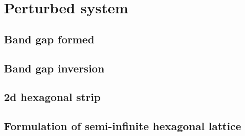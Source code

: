 \chapter{Perturbed system}
\label{perturbed}

\section{Band gap formed}

\section{Band gap inversion}

\section{2d hexagonal strip}

\section{Formulation of semi-infinite hexagonal lattice}
